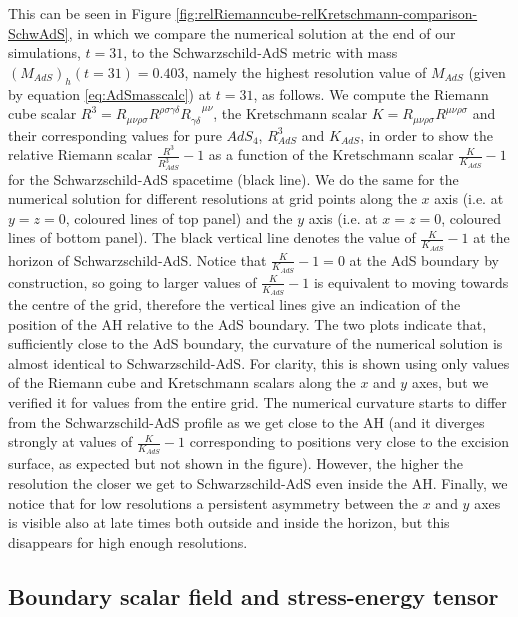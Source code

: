 \documentclass[a4paper,11pt]{article}
\numberwithin{equation}{section}
\begin{document}
This can be seen in Figure \ref{fig:relRiemanncube-relKretschmann-comparison-SchwAdS}, in which we compare the numerical solution at the end of our simulations, $t=31$, to the Schwarzschild-AdS metric with mass $(M_{AdS})_h(t=31)=0.403$, namely the highest resolution value of $M_{AdS}$ (given by equation \eqref{eq:AdSmasscalc}) at $t=31$, as follows. We compute the Riemann cube scalar $R^3=R_{\mu\nu\rho\sigma}R^{\rho\sigma\gamma\delta}R_{\gamma\delta}^{\;\;\;\;\mu\nu}$, the Kretschmann scalar $K=R_{\mu\nu\rho\sigma}R^{\mu\nu\rho\sigma}$ and their corresponding values for pure $AdS_4$, $R^3_{AdS}$ and $K_{AdS}$, in order to show the relative Riemann scalar $\frac{R^3}{R^3_{AdS}}-1$ as a function of the Kretschmann scalar $\frac{K}{K_{AdS}}-1$ for the Schwarzschild-AdS spacetime (black line). We do the same for the numerical solution for different resolutions at grid points along the $x$ axis (i.e. at $y=z=0$, coloured lines of top panel) and the $y$ axis (i.e. at $x=z=0$, coloured lines of bottom panel). The black vertical line denotes the value of $\frac{K}{K_{AdS}}-1$ at the horizon of Schwarzschild-AdS. Notice that $\frac{K}{K_{AdS}}-1=0$ at the AdS boundary by construction, so going to larger values of $\frac{K}{K_{AdS}}-1$ is equivalent to moving towards the centre of the grid, therefore the vertical lines give an indication of the position of the AH relative to the AdS boundary.
The two plots indicate that, sufficiently close to the AdS boundary, the curvature of the numerical solution is almost identical to Schwarzschild-AdS. For clarity, this is shown using only values of the Riemann cube and Kretschmann scalars along the $x$ and $y$ axes, but we verified it for values from the entire grid. The numerical curvature starts to differ from the Schwarzschild-AdS profile as we get close to the AH (and it diverges strongly at values of $\frac{K}{K_{AdS}}-1$ corresponding to positions very close to the excision surface, as expected but not shown in the figure). However, the higher the resolution the closer we get to Schwarzschild-AdS even inside the AH.
Finally, we notice that for low resolutions a persistent asymmetry between the $x$ and $y$ axes is visible also at late times both outside and inside the horizon, but this disappears for high enough resolutions.


\subsection{Boundary scalar field and stress-energy tensor}
\label{sec:resbouset}
\end{document}
